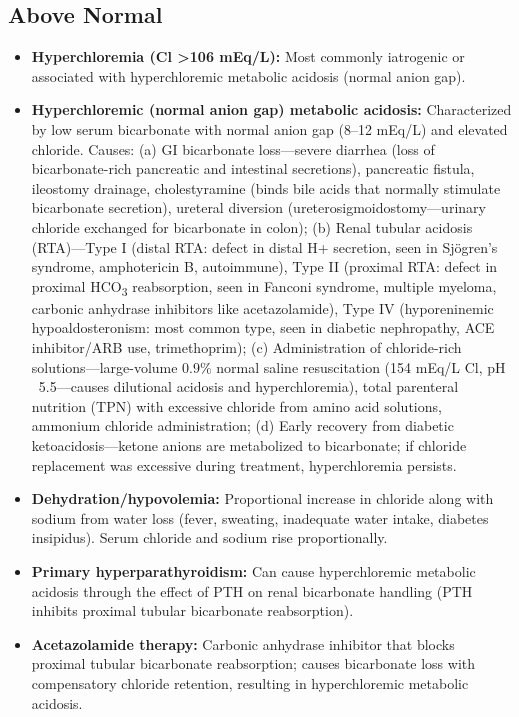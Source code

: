 \subsection*{Above Normal}
\begin{itemize}
  \item \textbf{Hyperchloremia (Cl >106 mEq/L):} Most commonly iatrogenic or associated with hyperchloremic metabolic acidosis (normal anion gap).
  \item \textbf{Hyperchloremic (normal anion gap) metabolic acidosis:} Characterized by low serum bicarbonate with normal anion gap (8--12 mEq/L) and elevated chloride. Causes: (a) GI bicarbonate loss---severe diarrhea (loss of bicarbonate-rich pancreatic and intestinal secretions), pancreatic fistula, ileostomy drainage, cholestyramine (binds bile acids that normally stimulate bicarbonate secretion), ureteral diversion (ureterosigmoidostomy---urinary chloride exchanged for bicarbonate in colon); (b) Renal tubular acidosis (RTA)---Type I (distal RTA: defect in distal H+ secretion, seen in Sj\"{o}gren's syndrome, amphotericin B, autoimmune), Type II (proximal RTA: defect in proximal HCO\textsubscript{3} reabsorption, seen in Fanconi syndrome, multiple myeloma, carbonic anhydrase inhibitors like acetazolamide), Type IV (hyporeninemic hypoaldosteronism: most common type, seen in diabetic nephropathy, ACE inhibitor/ARB use, trimethoprim); (c) Administration of chloride-rich solutions---large-volume 0.9\% normal saline resuscitation (154 mEq/L Cl, pH ~5.5---causes dilutional acidosis and hyperchloremia), total parenteral nutrition (TPN) with excessive chloride from amino acid solutions, ammonium chloride administration; (d) Early recovery from diabetic ketoacidosis---ketone anions are metabolized to bicarbonate; if chloride replacement was excessive during treatment, hyperchloremia persists.
  \item \textbf{Dehydration/hypovolemia:} Proportional increase in chloride along with sodium from water loss (fever, sweating, inadequate water intake, diabetes insipidus). Serum chloride and sodium rise proportionally.
  \item \textbf{Primary hyperparathyroidism:} Can cause hyperchloremic metabolic acidosis through the effect of PTH on renal bicarbonate handling (PTH inhibits proximal tubular bicarbonate reabsorption).
  \item \textbf{Acetazolamide therapy:} Carbonic anhydrase inhibitor that blocks proximal tubular bicarbonate reabsorption; causes bicarbonate loss with compensatory chloride retention, resulting in hyperchloremic metabolic acidosis.

\end{itemize}
